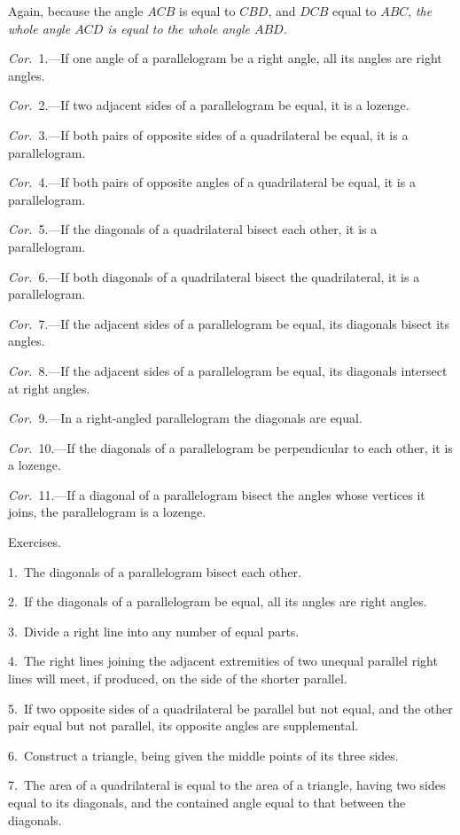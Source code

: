 \documentclass[oneside]{book}
\newcommand\exhead[1]{
\Needspace*{5\baselineskip}\begin{center}
\textsf{#1}
\end{center}
}
\begin{document}
Again, because the angle $ACB$ is equal to $CBD$, and
$DCB$ equal to $ABC$, \emph{the whole angle $ACD$ is equal to the
whole angle $ABD$.}

\textit{Cor.}~1.---If one angle of a parallelogram be a right
angle, all its angles are right angles.

\textit{Cor.}~2.---If two adjacent sides of a parallelogram be
equal, it is a lozenge.


\textit{Cor.}~3.---If both pairs of opposite sides of a quadrilateral
be equal, it is a parallelogram.

\textit{Cor.}~4.---If both pairs of opposite angles of a quadrilateral
be equal, it is a parallelogram.

\textit{Cor.}~5.---If the diagonals of a quadrilateral bisect
each other, it is a parallelogram.

\textit{Cor.}~6.---If both diagonals of a quadrilateral bisect
the quadrilateral, it is a parallelogram.

\textit{Cor.}~7.---If the adjacent sides of a parallelogram be
equal, its diagonals bisect its angles.

\textit{Cor.}~8.---If the adjacent sides of a parallelogram be
equal, its diagonals intersect at right angles.

\textit{Cor.}~9.---In a right-angled parallelogram the diagonals
are equal.

\textit{Cor.}~10.---If the diagonals of a parallelogram be perpendicular
to each other, it is a lozenge.

\textit{Cor.}~11.---If a diagonal of a parallelogram bisect the
angles whose vertices it joins, the parallelogram is a
lozenge.

\exhead{Exercises.}

\begin{footnotesize}
1.~The diagonals of a parallelogram bisect each other.

2.~If the diagonals of a parallelogram be equal, all its angles
are right angles.

3.~Divide a right line into any number of equal parts.

4.~The right lines joining the adjacent extremities of two
unequal parallel right lines will meet, if produced, on the side
of the shorter parallel.

5.~If two opposite sides of a quadrilateral be parallel but not
equal, and the other pair equal but not parallel, its opposite angles
are supplemental.

6.~Construct a triangle, being given the middle points of its
three sides.

7.~The area of a quadrilateral is equal to the area of a triangle,
having two sides equal to its diagonals, and the contained angle
equal to that between the diagonals.
\par\end{footnotesize}
\end{document}
